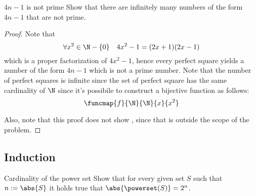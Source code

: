 \documentclass[a4paper, 12pt]{report}
\begin{document}
    \begin{framedprob}{$4n -1$ is not prime}
        Show that there are infinitely many numbers of the form $4n -1$ that are not prime.
    \end{framedprob}
    
    \begin{proof}
        Note that $$\forall x^2 \in \N - \{0\} \quad 4x^2 - 1 = (2x +1)(2x -1)$$ which is a proper factorization of $4x^2 -1$, hence every perfect square yields a number of the form $4n -1$ which is not a prime number. Note that the number of perfect squares is infinite since the set of perfect square has the same cardinality of $\N$ since it's possibile to construct a bijective function as follows: $$\funcmap{f}{\N}{\N}{x}{x^2}$$

        Also, note that this proof does not show , since that is outside the scope of the problem.
    \end{proof}

    \subsection{Induction}

    \begin{framedprob}{Cardinality of the power set}
        Show that for every given set $S$ such that $n := \abs{S}$ it holds true that $\abs{\powerset(S)} = 2^n$.
    \end{framedprob}

\end{document}
